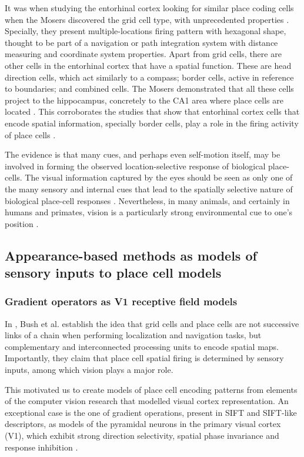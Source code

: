 It was when studying the entorhinal cortex looking for similar place coding cells when the Mosers discovered the grid cell type, with unprecedented properties \cite{hafting2005microstructure}. Specially, they present multiple-locations firing pattern with hexagonal shape, thought to be part of a navigation or path integration system with distance measuring and coordinate system properties. Apart from grid cells, there are other cells in the entorhinal cortex that have a spatial function. These are head direction cells, which act similarly to a compass; border cells, active in reference to boundaries; and combined cells. The Mosers demonstrated that all these cells project to the hippocampus, concretely to the CA1 area where place cells are located \cite{zhang2013optogenetic}. This corroborates the studies that show that entorhinal cortex cells that encode spatial information, specially	 border cells, play a role in the firing activity of place cells \cite{bush2014grid}.

The evidence is that many cues, and perhaps even self-motion itself, may be involved in forming the observed location-selective response of biological place-cells.  The visual information captured by the eyes should be seen as only one of the many sensory and internal cues that lead to the spatially selective nature of biological place-cell responses \cite{hassabis2009decoding}. Nevertheless, in many animals, and certainly in humans and primates, vision is a particularly strong environmental cue to one's position \cite{epstein1998cortical}.


\subsection{Appearance-based methods as models of sensory inputs to place cell models}

\subsubsection{Gradient operators as V1 receptive field models}

In \cite{bush2014grid}, Bush et al. establish the idea that grid cells and place cells are not successive links of a chain when performing localization and navigation tasks, but complementary and interconnected processing units to encode spatial maps. Importantly, they claim that place cell spatial firing is determined by sensory inputs, among which vision plays a major role.

This motivated us to create models of place cell encoding patterns from elements of the computer vision research that modelled visual cortex representation. An exceptional case is the one of gradient operations, present in SIFT and SIFT-like descriptors, as models of the pyramidal neurons in the primary visual cortex (V1), which exhibit strong direction selectivity, spatial phase invariance and response inhibition \cite{hubel1962receptive, dhruv2014cascaded,carandini2006simple}.

